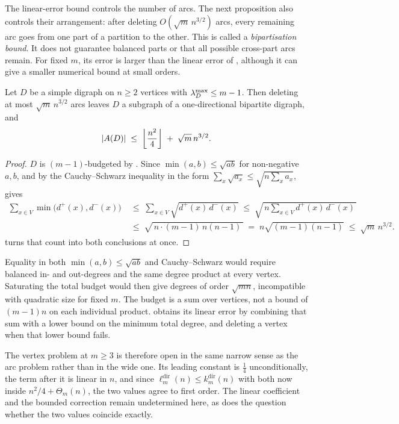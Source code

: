 The linear-error bound controls the number of arcs. The next proposition also controls their arrangement: after deleting $O(\sqrt m\,n^{3/2})$ arcs, every remaining arc goes from one part of a partition to the other. This is called a \emph{bipartisation bound}. It does not guarantee balanced parts or that all possible cross-part arcs remain. For fixed $m$, its error is larger than the linear error of , although it can give a smaller numerical bound at small orders.

\begin{proposition}\label{prop:dir-arc-stability}
Let $D$ be a simple digraph on $n \ge 2$ vertices with $\lambda^{\max}_D \le m-1$. Then deleting at most $\sqrt{m}\, n^{3/2}$ arcs leaves $D$ a subgraph of a one-directional bipartite digraph, and
\[
    |A(D)| \;\le\; \left\lfloor \frac{n^2}{4} \right\rfloor \;+\; \sqrt{m}\, n^{3/2}.
\]
\end{proposition}

\begin{proof}
$D$ is $(m-1)$-budgeted by . Since $\min(a,b) \le \sqrt{ab}$ for non-negative $a, b$, and by the Cauchy--Schwarz inequality in the form $\sum_x \sqrt{a_x} \le \sqrt{n \sum_x a_x}$,  gives
\[
\begin{aligned}
    \sum_{x \in V} \min\bigl(d^+(x), d^-(x)\bigr)
    &\;\le\; \sum_{x \in V} \sqrt{d^+(x)\, d^-(x)}
    \;\le\; \sqrt{\,n \sum_{x \in V} d^+(x)\, d^-(x)\,} \\[2pt]
    &\;\le\; \sqrt{\,n \cdot (m-1)\,n(n-1)\,}
    \;=\; n\sqrt{(m-1)(n-1)}
    \;\le\; \sqrt{m}\, n^{3/2}.
\end{aligned}
\]
 turns that count into both conclusions at once.
\end{proof}

Equality in both $\min(a,b)\le\sqrt{ab}$ and Cauchy--Schwarz would require balanced in- and out-degrees and the same degree product at every vertex. Saturating the total budget would then give degrees of order $\sqrt{mn}$, incompatible with quadratic size for fixed $m$. The budget is a sum over vertices, not a bound of $(m-1)n$ on each individual product.  obtains its linear error by combining that sum with a lower bound on the minimum total degree, and deleting a vertex when that lower bound fails.

The vertex problem at $m \ge 3$ is therefore open in the same narrow sense as the arc problem rather than in the wide one. Its leading constant is $\tfrac14$ unconditionally, the term after it is linear in $n$, and since $\ell_m^{\mathrm{dir}}(n) \le k_m^{\mathrm{dir}}(n)$ with both now inside $n^2/4 + \Theta_m(n)$, the two values agree to first order. The linear coefficient and the bounded correction remain undetermined here, as does the question whether the two values coincide exactly.

